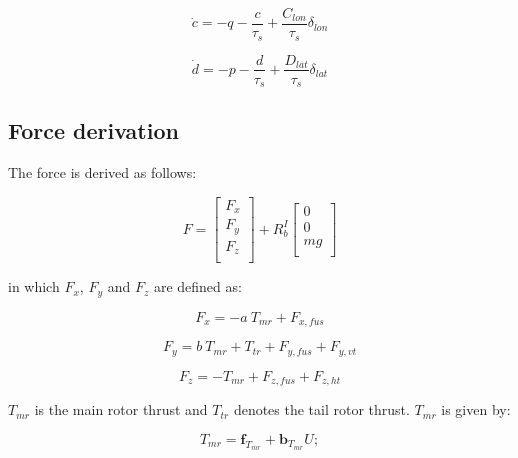 \begin{equation}
	\dot{c}=-q-\frac{c}{\tau_s}+\frac{C_{lon}}{\tau_s}\delta_{lon}
\end{equation}

\begin{equation}
	\dot{d}=-p-\frac{d}{\tau_s}+\frac{D_{lat}}{\tau_s}\delta_{lat}
\end{equation} 

\subsection{Force derivation} \label{force section}


The force is derived as follows:

\begin{equation}
	F= 
	\begin{bmatrix}
		F_x \\
		F_y\\
		F_z\\
	\end{bmatrix}
	+R_b^I \begin{bmatrix}
		0 \\
		0\\
		mg\\
	\end{bmatrix}
\end{equation}

in which $F_x$, $F_y$ and $F_z$ are defined as:

\begin{equation}
	F_x=-a\ T_{mr}+F_{x,fus}
\end{equation}

\begin{equation}
	F_y=b\ T_{mr}+T_{tr}+F_{y,fus} + F_{y,vt}
\end{equation}

\begin{equation}
	F_z=-T_{mr}+F_{z,fus} + F_{z,ht}
\end{equation}

$T_{mr}$ is the main rotor thrust and $T_{tr}$ denotes the tail rotor thrust. $T_{mr}$ is given by:

\begin{equation}
	T_{mr} = \textbf{f}_{T_{mr}}+\textbf{b}_{T_{mr}}U;
	\label{T_mr}
\end{equation}

